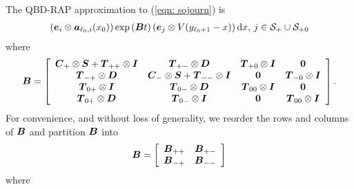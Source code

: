 The QBD-RAP approximation to (\ref{eqn: sojourn}) is 
\begin{align}
	(\boldsymbol e_i\otimes \boldsymbol  a_{\ell_0,i}(x_0)) \exp\left(\boldsymbol{B}t\right)(\boldsymbol e_j \otimes V(y_{\ell_0+1}-x))\, \mathrm{d} x,\,j\in\mathcal{S}_+\cup\mathcal{S}_{+0} \label{eqn: ldll}
\end{align}
where 
\[\boldsymbol{B} = \left[\begin{array}{cccc}
	\boldsymbol{C}_+\otimes \boldsymbol{S} + \boldsymbol{T}_{++}\otimes \boldsymbol{I} & \boldsymbol{T}_{+-}\otimes \boldsymbol{D} & \boldsymbol{T}_{+0}\otimes \boldsymbol{I} & \boldsymbol 0 \\
	\boldsymbol{T}_{-+}\otimes \boldsymbol{D} & \boldsymbol{C}_-\otimes \boldsymbol{S} + \boldsymbol{T}_{--}\otimes \boldsymbol{I} &\boldsymbol 0 & \boldsymbol{T}_{-0}\otimes \boldsymbol{I} \\
	\boldsymbol{T}_{0+}\otimes \boldsymbol{I} & \boldsymbol{T}_{0-}\otimes \boldsymbol{D} & \boldsymbol{T}_{00}\otimes \boldsymbol{I} & \boldsymbol 0 \\
	\boldsymbol{T}_{0+}\otimes \boldsymbol{D} & \boldsymbol{T}_{0-}\otimes \boldsymbol{I} &\boldsymbol 0 & \boldsymbol{T}_{00}\otimes \boldsymbol{I} 
	\end{array}\right].
\] 
For convenience, and without loss of generality, we reorder the rows and columns of \(\boldsymbol B\) and partition \(\boldsymbol{B}\) into 
\begin{align}
	\boldsymbol B = \left[\begin{array}{ccc} \boldsymbol B_{++} & \boldsymbol B_{+-} \\ \boldsymbol B_{-+} & \boldsymbol B_{--}\end{array}\right]
\end{align}
where 
